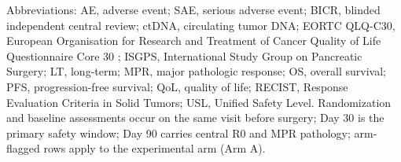 \vspace{0.3em}

\noindent Abbreviations: AE, adverse event; SAE, serious adverse event; BICR,
blinded independent central review; ctDNA, circulating tumor DNA; EORTC QLQ-C30,
European Organisation for Research and Treatment of Cancer Quality of Life
Questionnaire Core 30 \cite{EORTCqlqc30}; ISGPS, International Study Group on
Pancreatic Surgery; LT, long-term; MPR, major pathologic response; OS, overall
survival; PFS, progression-free survival; QoL, quality of life; RECIST, Response
Evaluation Criteria in Solid Tumors; USL, Unified Safety Level. Randomization and
baseline assessments occur on the same visit before surgery; Day 30 is the primary
safety window; Day 90 carries central R0 and MPR pathology; arm-flagged rows apply
to the experimental arm (Arm A).
